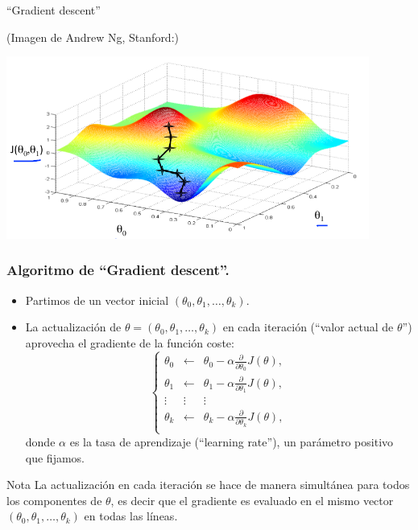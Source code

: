 \documentclass[aspectratio=169]{beamer}
\begin{document}
\begin{frame}{``Gradient descent''}

  {\scriptsize (Imagen de Andrew Ng, Stanford:)}
\begin{center}
  \includegraphics[height=6cm]{gradient-descent-ng.png}
\end{center}
\end{frame}
\begin{frame}
\frametitle{Algoritmo de ``Gradient descent''.}
\begin{itemize}
\item<2-> Partimos de un vector inicial $(\theta_0,\theta_1, \ldots, \theta_k)$.
\item<3-> La actualización de $\theta = (\theta_0,\theta_1,
  \ldots,\theta_k)$ en cada iteración (``valor actual de $\theta$'') aprovecha el gradiente de la función coste:
$$\left\{\begin{array}{lcl}
\theta_0&\leftarrow &\theta_0-\alpha\frac{\partial}{\partial \theta_0}J(\theta),\\
\theta_1&\leftarrow &\theta_1-\alpha\frac{\partial}{\partial \theta_1}J(\theta),\\
\vdots&\vdots&\vdots\\
\theta_k&\leftarrow &\theta_k-\alpha\frac{\partial}{\partial \theta_k}J(\theta),\\
\end{array}\right.$$
donde $\alpha$ es la tasa de aprendizaje (``learning rate''), un parámetro positivo que fijamos.
\end{itemize}
\begin{block}{Nota}
{\scriptsize La actualización en cada iteración se hace de manera
  simultánea para todos los componentes de $\theta$, es decir que el
  gradiente es evaluado en el mismo vector
  $(\theta_0,\theta_1,\ldots,\theta_k)$ en todas las líneas.} 
  
\end{block}
\end{frame}
\end{document}
